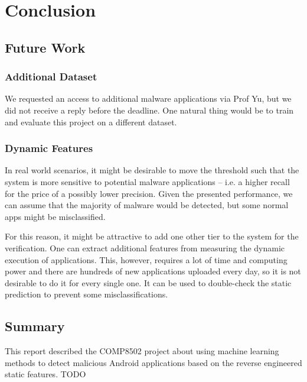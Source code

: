 \section{Conclusion}
\subsection{Future Work}
\subsubsection{Additional Dataset}
We requested an access to additional malware applications via Prof Yu, but we did not receive a reply before the deadline. One natural thing would be to train and evaluate this project on a different dataset.
\subsubsection{Dynamic Features}
In real world scenarios, it might be desirable to move the threshold such that the system is more sensitive to potential malware applications -- i.e. a higher recall for the price of a possibly lower precision. Given the presented performance, we can assume that the majority of malware would be detected, but some normal apps might be misclassified.

For this reason, it might be attractive to add one other tier to the system for the verification. One can extract additional features from measuring the dynamic execution of applications. This, however, requires a lot of time and computing power and there are hundreds of new applications uploaded every day, so it is not desirable to do it for every single one. It can be used to double-check the static prediction to prevent some misclassifications.

\subsection{Summary}
This report described the COMP8502 project about using machine learning methods to detect malicious Android applications based on the reverse engineered static features. TODO